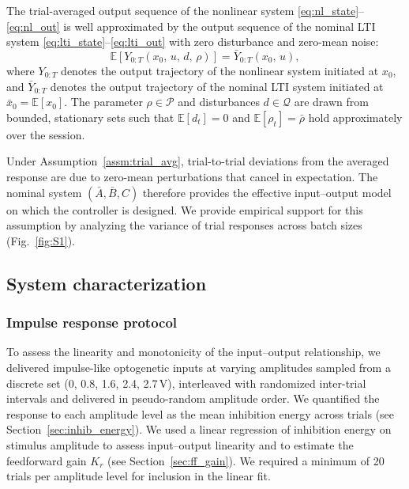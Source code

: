 \begin{assumption}
\label{assm:trial_avg}
The trial-averaged output sequence of the nonlinear system
\eqref{eq:nl_state}--\eqref{eq:nl_out} is well approximated by the
output sequence of the nominal LTI system
\eqref{eq:lti_state}--\eqref{eq:lti_out} with zero disturbance and
zero-mean noise:
\begin{equation}
    \mathbb{E}\!\left[Y_{0:T}(x_{0},\,u,\,d,\,\rho)\right]
    = \bar{Y}_{0:T}(x_{0},\,u),
    \label{eq:trial_avg}
\end{equation}
where $Y_{0:T}$ denotes the output trajectory of the nonlinear system
initiated at $x_{0}$, and $\bar{Y}_{0:T}$ denotes the output trajectory
of the nominal LTI system initiated at $\bar{x}_{0} =
\mathbb{E}[x_{0}]$. The parameter $\rho \in \mathcal{P}$ and
disturbances $d \in \mathcal{Q}$ are drawn from bounded, stationary
sets such that $\mathbb{E}[d_{t}] = 0$ and $\mathbb{E}[\rho_{t}] =
\bar{\rho}$ hold approximately over the session.
\end{assumption}

Under Assumption~\ref{assm:trial_avg}, trial-to-trial deviations from
the averaged response are due to zero-mean perturbations that cancel in
expectation. The nominal system $(\bar{A},\bar{B},C)$ therefore provides
the effective input--output model on which the controller is designed.
We provide empirical support for this assumption by analyzing the
variance of trial responses across batch sizes (Fig.~\ref{fig:S1}).

\subsection*{System characterization}

\subsubsection*{Impulse response protocol}

To assess the linearity and monotonicity of the input--output
relationship, we delivered impulse-like optogenetic inputs at varying
amplitudes sampled from a discrete set (0, 0.8, 1.6, 2.4, 2.7\,V),
interleaved with randomized inter-trial intervals and delivered in
pseudo-random amplitude order. We quantified the response to each
amplitude level as the mean inhibition energy across trials
(see Section~\ref{sec:inhib_energy}). We used a linear regression of
inhibition energy on stimulus amplitude to assess input--output
linearity and to estimate the feedforward gain $K_{r}$ (see
Section~\ref{sec:ff_gain}). We required a minimum of 20 trials per
amplitude level for inclusion in the linear fit.

